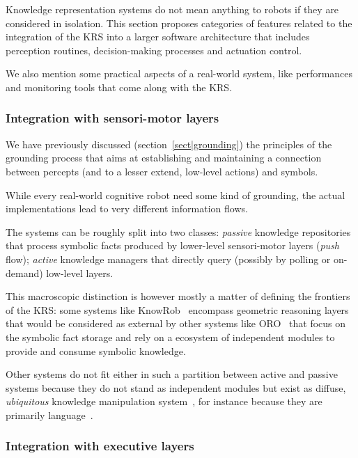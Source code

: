 \documentclass[a4paper, twocolumn]{article}
\begin{document}
Knowledge representation systems do not mean anything to robots if they are
considered in isolation. This section proposes categories of features related
to the integration of the KRS into a larger software architecture that includes
perception routines, decision-making processes and actuation control.

We also mention some practical aspects of a real-world system, like
performances and monitoring tools that come along with the KRS.

\subsubsection{Integration with sensori-motor layers}
\label{sect|integration-sensorimotor}

We have previously discussed (section~\ref{sect|grounding}) the principles of
the grounding process that aims at establishing and maintaining a connection
between percepts (and to a lesser extend, low-level actions) and symbols.

While every real-world cognitive robot need some kind of grounding, the actual
implementations lead to very different information flows.

The systems can be roughly split into two classes: \emph{passive} knowledge
repositories that process symbolic facts produced by lower-level sensori-motor
layers (\emph{push} flow); \emph{active} knowledge managers that directly query
(possibly by polling or on-demand) low-level layers.

This macroscopic distinction is however mostly a matter of defining the
frontiers of the KRS: some systems like KnowRob~\cite{Tenorth2009a} encompass
geometric reasoning layers that would be considered as external by other
systems like ORO~\cite{Lemaignan2010} that focus on the symbolic fact storage
and rely on a ecosystem of independent modules to provide and consume symbolic
knowledge.


Other systems do not fit either in such a partition between active and passive
systems because they do not stand as independent modules but exist as diffuse,
\emph{ubiquitous} knowledge manipulation system~\cite{Jacobsson2008}, for
instance because they are primarily language~\cite{Ferrein2008, Sabri2011}.

\subsubsection{Integration with executive layers}
\label{sect|integration-executive-layers}
\end{document}
